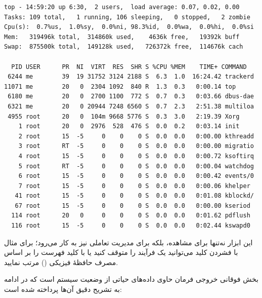 \begin{latin}
\begin{lstlisting}
top - 14:59:20 up 6:30,  2 users,  load average: 0.07, 0.02, 0.00
Tasks: 109 total,   1 running, 106 sleeping,   0 stopped,   2 zombie
Cpu(s):  0.7%us,  1.0%sy,  0.0%ni, 98.3%id,  0.0%wa,  0.0%hi,  0.0%si
Mem:   319496k total,  314860k used,    4636k free,   19392k buff
Swap:  875500k total,  149128k used,   726372k free,  114676k cach

  PID USER      PR  NI  VIRT  RES  SHR S %CPU %MEM    TIME+ COMMAND
 6244 me        39  19 31752 3124 2188 S  6.3  1.0  16:24.42 trackerd
11071 me        20   0  2304 1092  840 R  1.3  0.3   0:00.14 top
 6180 me        20   0  2700 1100  772 S  0.7  0.3   0:03.66 dbus-dae
 6321 me        20   0 20944 7248 6560 S  0.7  2.3   2:51.38 multiloa
 4955 root      20   0  104m 9668 5776 S  0.3  3.0   2:19.39 Xorg
    1 root      20   0  2976  528  476 S  0.0  0.2   0:03.14 init
    2 root      15  -5     0    0    0 S  0.0  0.0   0:00.00 kthreadd
    3 root      RT  -5     0    0    0 S  0.0  0.0   0:00.00 migratio
    4 root      15  -5     0    0    0 S  0.0  0.0   0:00.72 ksoftirq
    5 root      RT  -5     0    0    0 S  0.0  0.0   0:00.04 watchdog
    6 root      15  -5     0    0    0 S  0.0  0.0   0:00.42 events/0
    7 root      15  -5     0    0    0 S  0.0  0.0   0:00.06 khelper
   41 root      15  -5     0    0    0 S  0.0  0.0   0:01.08 kblockd/
   67 root      15  -5     0    0    0 S  0.0  0.0   0:00.00 kseriod
  114 root      20   0     0    0    0 S  0.0  0.0   0:01.62 pdflush
  116 root      15  -5     0    0    0 S  0.0  0.0   0:02.44 kswapd0
\end{lstlisting}
\end{latin}

این ابزار نه‌تنها برای مشاهده، بلکه برای مدیریت تعاملی نیز به کار می‌رود؛ برای مثال با فشردن کلید  می‌توانید یک فرآیند را متوقف کنید یا با کلید  فهرست را بر اساس مصرف حافظهٔ فیزیکی () مرتب نمایید.

بخش فوقانی خروجی فرمان  حاوی داده‌های حیاتی از وضعیت سیستم است که در ادامه به تشریح دقیق آن‌ها پرداخته شده است:

